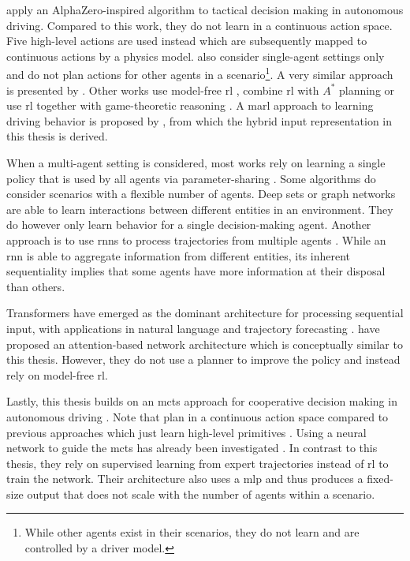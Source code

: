 \cite{hoelCombiningPlanningDeep2020} apply an AlphaZero-inspired algorithm to tactical decision making in autonomous driving. Compared to this work, they do not learn in a continuous action space. Five high-level actions are used instead which are subsequently mapped to continuous actions by a physics model. \cite{hoelCombiningPlanningDeep2020} also consider single-agent settings only and do not plan actions for other agents in a scenario\footnote{While other agents exist in their scenarios, they do not learn and are controlled by a driver model.}. A very similar approach is presented by \cite{chenDrivingManeuversPrediction2020}. Other works use model-free \gls{rl} \cite{liaoDecisionMakingStrategyHighway2020}, combine \gls{rl} with $A^*$ planning \cite{yurtseverIntegratingDeepReinforcement2020} or use \gls{rl} together with game-theoretic reasoning \cite{boutonReinforcementLearningIterative2020}. A \gls{marl} approach to learning driving behavior is proposed by \cite{bacchianiMicroscopicTrafficSimulation2019}, from which the hybrid input representation in this thesis is derived.

When a multi-agent setting is considered, most works rely on learning a single policy that is used by all agents via parameter-sharing \cite{bacchianiMicroscopicTrafficSimulation2019, petosaMultiplayerAlphaZero2019}. Some algorithms do consider scenarios with a flexible number of agents. Deep sets \cite{hugleDynamicInputDeep2019} or graph networks \cite{huegleDynamicInteractionAwareScene2019} are able to learn interactions between different entities in an environment. They do however only learn behavior for a single decision-making agent. Another approach is to use \glspl{rnn} to process trajectories from multiple agents \cite{everettCollisionAvoidancePedestrianRich2020}. While an \gls{rnn} is able to aggregate information from different entities, its inherent sequentiality implies that some agents have more information at their disposal than others.

Transformers \cite{vaswaniAttentionAllYou2017} have emerged as the dominant architecture for processing sequential input, with applications in natural language \cite{devlinBERTPretrainingDeep2019} and trajectory forecasting \cite{giuliariTransformerNetworksTrajectory2020}. \cite{wrightNeuralAttentionalArchitecturesDeep} have proposed an attention-based network architecture which is conceptually similar to this thesis. However, they do not use a planner to improve the policy and instead rely on model-free \gls{rl}.

Lastly, this thesis builds on an \gls{mcts} approach for cooperative decision making in autonomous driving \cite{kurzerDecentralizedCooperativePlanning2018}. Note that \cite{kurzerDecentralizedCooperativePlanning2018} plan in a continuous action space compared to previous approaches which just learn high-level primitives \cite{lenzTacticalCooperativePlanning2016}. Using a neural network to guide the \gls{mcts} has already been investigated \cite{kurzerAcceleratingCooperativePlanning2020}. In contrast to this thesis, they rely on supervised learning from expert trajectories instead of \gls{rl} to train the network. Their architecture also uses a \gls{mlp} and thus produces a fixed-size output that does not scale with the number of agents within a scenario.
